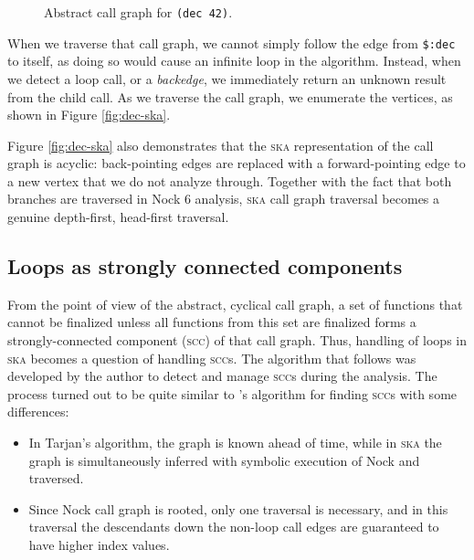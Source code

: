 \documentclass[twoside]{article}
\begin{document}
\begin{figure}
  \centering
  \caption{Abstract call graph for \texttt{(dec 42)}.}
  \label{fig:dec-abstract}
\end{figure}

When we traverse that call graph, we cannot simply follow the edge from \lstinline[style=inlinecode]{$:dec} to itself, as doing so would cause an infinite loop in the algorithm.  Instead, when we detect a loop call, or a \emph{backedge}, we immediately return an unknown result from the child call.  As we traverse the call graph, we enumerate the vertices, as shown in Figure \ref{fig:dec-ska}.

Figure \ref{fig:dec-ska} also demonstrates that the \textsc{ska} representation of the call graph is acyclic: back-pointing edges are replaced with a forward-pointing edge to a new vertex that we do not analyze through.  Together with the fact that both branches are traversed in Nock 6 analysis, \textsc{ska} call graph traversal becomes a genuine depth-first, head-first traversal.

\subsection{Loops as strongly connected components}

From the point of view of the abstract, cyclical call graph, a set of functions that cannot be finalized unless all functions from this set are finalized forms a strongly-connected component (\textsc{scc}) of that call graph.  Thus, handling of loops in \textsc{ska} becomes a question of handling \textsc{scc}s.  The algorithm that follows was developed by the author to detect and manage \textsc{scc}s during the analysis.  The process turned out to be quite similar to \citeauthor{Tarjan1972}'s \citeyear{Tarjan1972} algorithm for finding \textsc{scc}s with some differences:
\begin{itemize}
  \item  In Tarjan's algorithm, the graph is known ahead of time, while in \textsc{ska} the graph is simultaneously inferred with symbolic execution of Nock and traversed.
  \item  Since Nock call graph is rooted, only one traversal is necessary, and in this traversal the descendants down the non-loop call edges are guaranteed to have higher index values.
\end{itemize}
\end{document}
